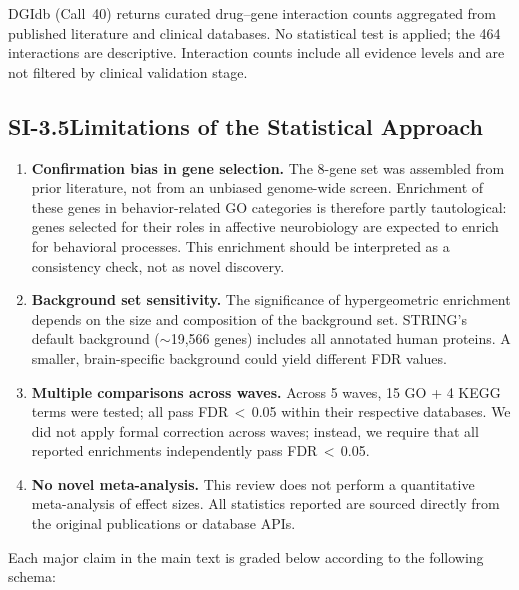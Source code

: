 DGIdb (Call~40) returns curated drug--gene interaction counts aggregated
from published literature and clinical databases.  No statistical test
is applied; the 464 interactions are descriptive.  Interaction counts
include all evidence levels and are not filtered by clinical validation
stage.

\subsection*{SI-3.5\quad Limitations of the Statistical Approach}

\begin{enumerate}[nosep]
  \item \textbf{Confirmation bias in gene selection.}
        The 8-gene set was assembled from prior literature, not from an
        unbiased genome-wide screen.  Enrichment of these genes in
        behavior-related GO categories is therefore partly tautological:
        genes selected for their roles in affective neurobiology are expected
        to enrich for behavioral processes.  This enrichment should be
        interpreted as a consistency check, not as novel discovery.
  \item \textbf{Background set sensitivity.}
        The significance of hypergeometric enrichment depends on the size
        and composition of the background set.  STRING's default background
        ($\sim$19,566 genes) includes all annotated human proteins.  A smaller,
        brain-specific background could yield different FDR values.
  \item \textbf{Multiple comparisons across waves.}
        Across 5 waves, 15 GO + 4 KEGG terms were tested; all pass
        FDR\,$<$\,0.05 within their respective databases.  We did not apply
        formal correction across waves; instead, we require that all
        reported enrichments independently pass FDR\,$<$\,0.05.
  \item \textbf{No novel meta-analysis.}
        This review does not perform a quantitative meta-analysis of effect
        sizes.  All statistics reported are sourced directly from the
        original publications or database APIs.
\end{enumerate}



Each major claim in the main text is graded below according to the following
schema:

